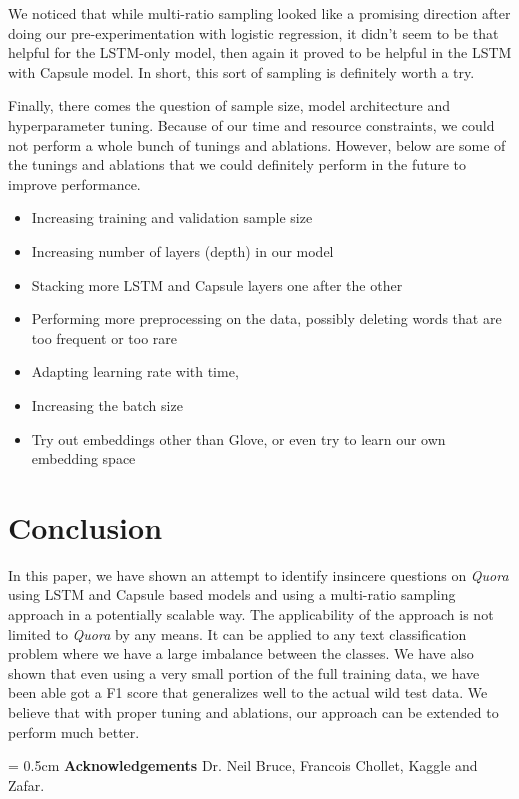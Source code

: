 \documentclass[11pt,twocolumn,letterpaper]{article}
\begin{document}
We noticed that while multi-ratio sampling looked like a promising direction after doing our pre-experimentation with logistic regression, it didn't seem to be that helpful for the LSTM-only model, then again it proved to be helpful in the LSTM with Capsule model. In short, this sort of sampling is definitely worth a try.

Finally, there comes the question of sample size, model architecture and hyperparameter tuning. Because of our time and resource constraints, we could not perform a whole bunch of tunings and ablations. However, below are some of the tunings and ablations that we could definitely perform in the future to improve performance.

\begin{itemize}
\item Increasing training and validation sample size
\item Increasing number of layers (depth) in our model
\item Stacking more LSTM and Capsule layers one after the other
\item Performing more preprocessing on the data, possibly deleting words that are too frequent or too rare
\item Adapting learning rate with time,
\item Increasing the batch size
\item Try out embeddings other than Glove, or even try to learn our own embedding space
\end{itemize}

\section{Conclusion}

In this paper, we have shown an attempt to identify insincere questions on \textit{Quora} using LSTM and Capsule based models and using a multi-ratio sampling approach in a potentially scalable way. The applicability of the approach is not limited to \textit{Quora} by any means. It can be applied to any text classification problem where we have a large imbalance between the classes. We have also shown that even using a very small portion of the full training data, we have been able got a F1 score that generalizes well to the actual wild test data. We believe that with proper tuning and ablations, our approach can be extended to perform much better.

\parskip = 0.5cm
\noindent \textbf{Acknowledgements} Dr. Neil Bruce, Francois Chollet, Kaggle and Zafar.


\printbibliography
\end{document}
